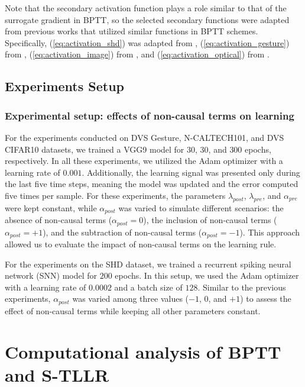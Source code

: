 \documentclass[10pt]{article} %
\renewcommand\hl[1]{#1}
\begin{document}
        \hl{Note that the secondary activation function plays a role similar to that of the surrogate gradient in BPTT, so the selected secondary functions were adapted from previous works that utilized similar functions in BPTT schemes. 
        Specifically,} (\ref{eq:activation_shd}) was adapted from \citet{Ortner2023OnlineProjection}, (\ref{eq:activation_gesture}) from \citet{Apolinario2023Hardware/SoftwareNetworks}, (\ref{eq:activation_image}) from \citet{Wu2018Spatio-temporalNetworks}, and (\ref{eq:activation_optical}) from \citet{Hagenaars2021Self-SupervisedNetworks}.


        \subsection{Experiments Setup}\label{sec:experiments_setup}
        \subsubsection{Experimental setup: effects of non-causal terms on learning}

        For the experiments conducted on DVS Gesture, N-CALTECH101, and DVS CIFAR10 datasets, we trained a VGG9 model for $30$, $30$, and $300$ epochs, respectively. 
        In all these experiments, we utilized the Adam optimizer with a learning rate of $0.001$. 
        Additionally, the learning signal was presented only during the last five time steps, meaning the model was updated and the error computed five times per sample.
        For these experiments, the parameters $\lambda_{post}$, $\lambda_{pre}$, and $\alpha_{pre}$ were kept constant, while $\alpha_{post}$ was varied to simulate different scenarios: the absence of non-causal terms ($\alpha_{post} = 0$), the inclusion of non-causal terms ($\alpha_{post} = +1$), and the subtraction of non-causal terms ($\alpha_{post} = -1$). 
        This approach allowed us to evaluate the impact of non-causal terms on the learning rule.

        For the experiments on the SHD dataset, we trained a recurrent spiking neural network (SNN) model for $200$ epochs. 
        In this setup, we used the Adam optimizer with a learning rate of $0.0002$ and a batch size of $128$. 
        Similar to the previous experiments, $\alpha_{post}$ was varied among three values ($-1$, $0$, and $+1$) to assess the effect of non-causal terms while keeping all other parameters constant.

\section{Computational analysis of  BPTT and S-TLLR }\label{sec:bptt_stllr_analysis}
\end{document}
